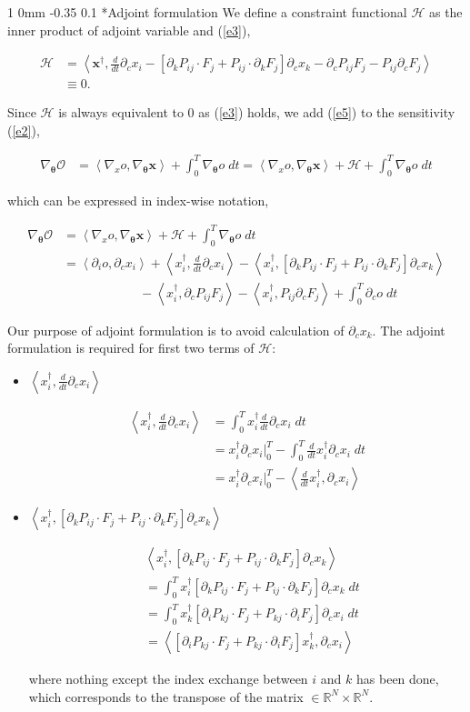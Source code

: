 \documentclass[11pt]{article}
\makeatletter
\renewcommand{\subsection}{\@startsection
{subsection}%
{1}%
{0mm}%
{-0.35\baselineskip}%
{0.1\baselineskip}%
{\normalfont\large\bfseries\color{brown}}}%
\def\Dnorm#1#2{ \frac{d #1 }{ d #2} }
\newcommand\eqsp[2]{
\begin{equation#1}
\begin{split}
#2
\end{split}
\end{equation#1}
}
\newcommand{\cH}{\mathcal{H}}
\newcommand{\cO}{\mathcal{O}}
\newcommand{\bx}{\mathbf{x}}
\newcommand{\bt}{\mathbf{\theta}}
\newcommand{\inprod}[2]{\left\langle #1,#2 \right\rangle}
\makeatother
\begin{document}
\subsection*{Adjoint formulation}
We define a constraint functional $\cH$ as the inner product of adjoint variable and (\ref{e3}),
\eqsp{}{
\cH &= \inprod{\bx^{\dagger}}{\Dnorm{}{t}\partial_cx_i - \left[ \partial_kP_{ij}\cdot F_j + P_{ij}\cdot\partial_kF_j \right]\partial_cx_k - \partial_cP_{ij}F_j - P_{ij}\partial_cF_j }\\
&\equiv 0.
\label{e5}
}
Since $\cH$ is always equivalent to 0 as (\ref{e3}) holds, we add (\ref{e5}) to the sensitivity (\ref{e2}),
\eqsp{*}{
\nabla_{\bt}\cO &= \inprod{\nabla_xo}{\nabla_{\bt}\bx} + \int_0^T \nabla_{\bt}o\;dt = \inprod{\nabla_xo}{\nabla_{\bt}\bx} + \cH + \int_0^T \nabla_{\bt}o\;dt
}
which can be expressed in index-wise notation,
\eqsp{*}{
\nabla_{\bt}\cO &= \inprod{\nabla_xo}{\nabla_{\bt}\bx} + \cH + \int_0^T \nabla_{\bt}o\;dt\\
&= \inprod{\partial_io}{\partial_cx_i}
+ \inprod{x_i^{\dagger}}{\Dnorm{}{t}\partial_cx_i}
- \inprod{x_i^{\dagger}}{\left[ \partial_kP_{ij}\cdot F_j + P_{ij}\cdot\partial_kF_j \right]\partial_cx_k}\\
&\qquad\qquad\qquad - \inprod{x_i^{\dagger}}{\partial_cP_{ij}F_j} - \inprod{x_i^{\dagger}}{P_{ij}\partial_cF_j} + \int_0^T \partial_co\;dt
}
Our purpose of adjoint formulation is to avoid calculation of $\partial_cx_k$.
The adjoint formulation is required for first two terms of $\cH$:
\begin{itemize}
\item $\inprod{x_i^{\dagger}}{\Dnorm{}{t}\partial_cx_i}$
\eqsp{*}{
\inprod{x_i^{\dagger}}{\Dnorm{}{t}\partial_cx_i} &= \int_0^T x_i^{\dagger}\Dnorm{}{t}\partial_cx_i\;dt\\
&= x_i^{\dagger}\partial_cx_i\bigg|_{0}^{T} - \int_0^T \Dnorm{}{t}x_i^{\dagger}\partial_cx_i\;dt\\
&= x_i^{\dagger}\partial_cx_i\bigg|_{0}^{T} - \inprod{\Dnorm{}{t}x_i^{\dagger}}{\partial_cx_i}
}
\item $\inprod{x_i^{\dagger}}{\left[ \partial_kP_{ij}\cdot F_j + P_{ij}\cdot\partial_kF_j \right]\partial_cx_k}$
\eqsp{*}{
&\inprod{x_i^{\dagger}}{\left[ \partial_kP_{ij}\cdot F_j + P_{ij}\cdot\partial_kF_j \right]\partial_cx_k}\\
&= \int_0^T x_i^{\dagger}\left[ \partial_kP_{ij}\cdot F_j + P_{ij}\cdot\partial_kF_j \right]\partial_cx_k\;dt\\
&= \int_0^T x_k^{\dagger}\left[ \partial_iP_{kj}\cdot F_j + P_{kj}\cdot\partial_iF_j \right]\partial_cx_i\;dt\\
&= \inprod{ \left[ \partial_iP_{kj}\cdot F_j + P_{kj}\cdot\partial_iF_j \right]x_k^{\dagger} }{ \partial_cx_i }
}
where nothing except the index exchange between $i$ and $k$ has been done,
which corresponds to the transpose of the matrix $\in\mathbb{R}^N\times\mathbb{R}^N$.
\end{itemize}
\end{document}
